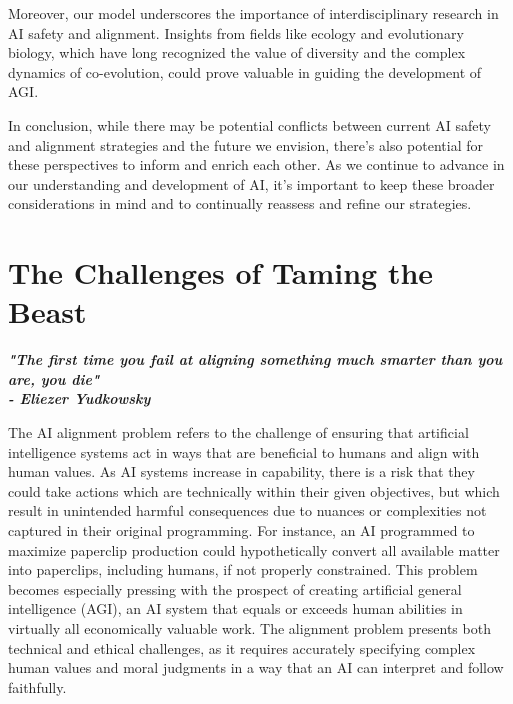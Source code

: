 \documentclass{article}[10pt]
\begin{document}
Moreover, our model underscores the importance of interdisciplinary research in AI safety and alignment. 
Insights from fields like ecology and evolutionary biology, which have long recognized the value of diversity and the complex dynamics of co-evolution, could prove valuable in guiding the development of AGI. \par

In conclusion, while there may be potential conflicts between current AI safety and alignment strategies and the future we envision, there's also potential for these perspectives to inform and enrich each other. 
As we continue to advance in our understanding and development of AI, it's important to keep these broader considerations in mind and to continually reassess and refine our strategies.\par




\section{The Challenges of Taming the Beast}
\label{section:philosophy}

\noindent \begin{center}\begin{minipage}[t]{0.9\columnwidth}
    \textbf{\textit{"The first time you fail at aligning something much smarter than you are, you die"}}\\
    \textbf{\textit{- Eliezer Yudkowsky}}
\end{minipage}\end{center}
\vspace{0.05in}

The AI alignment problem refers to the challenge of ensuring that artificial intelligence systems act in ways that are beneficial to humans and align with human values. 
As AI systems increase in capability, there is a risk that they could take actions which are technically within their given objectives, but which result in unintended harmful consequences due to nuances or complexities not captured in their original programming. 
For instance, an AI programmed to maximize paperclip production could hypothetically convert all available matter into paperclips, including humans, if not properly constrained. 
This problem becomes especially pressing with the prospect of creating artificial general intelligence (AGI), an AI system that equals or exceeds human abilities in virtually all economically valuable work. 
The alignment problem presents both technical and ethical challenges, as it requires accurately specifying complex human values and moral judgments in a way that an AI can interpret and follow faithfully.\par
\end{document}

